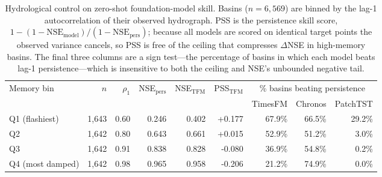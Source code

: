 \begin{table}[t]
\centering
\caption{Hydrological control on zero-shot foundation-model skill. Basins ($n=6{,}569$) are binned by the lag-1 autocorrelation of their observed hydrograph. PSS is the persistence skill score, $1-(1-\mathrm{NSE_{model}})/(1-\mathrm{NSE_{pers}})$; because all models are scored on identical target points the observed variance cancels, so PSS is free of the ceiling that compresses $\Delta$NSE in high-memory basins. The final three columns are a sign test---the percentage of basins in which each model beats lag-1 persistence---which is insensitive to both the ceiling and NSE's unbounded negative tail.}
\label{tab:hydro_controls}
\begin{tabular}{lrrrrrrrr}
\hline
Memory bin & $n$ & $\rho_1$ & NSE$_{\text{pers}}$ & NSE$_{\text{TFM}}$ & PSS$_{\text{TFM}}$ & \multicolumn{3}{c}{\% basins beating persistence} \\
\cline{7-9}
 & & & & & & TimesFM & Chronos & PatchTST \\
\hline
Q1 (flashiest) & 1,643 & 0.60 & 0.246 & 0.402 & +0.177 & 67.9\% & 66.5\% & 29.2\% \\
Q2 & 1,642 & 0.80 & 0.643 & 0.661 & +0.015 & 52.9\% & 51.2\% & 3.0\% \\
Q3 & 1,642 & 0.91 & 0.838 & 0.828 & -0.080 & 36.9\% & 54.8\% & 0.2\% \\
Q4 (most damped) & 1,642 & 0.98 & 0.965 & 0.958 & -0.206 & 21.2\% & 74.9\% & 0.0\% \\
\hline
\end{tabular}
\end{table}